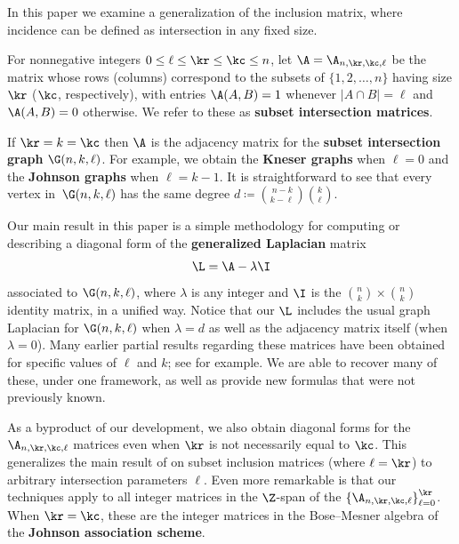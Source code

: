 In this paper we examine a generalization of the inclusion matrix, where incidence can be defined as intersection in any fixed size.


\begin{firstdef}
For nonnegative integers $0 \leq \ell \leq \kr \leq \kc \leq n$, let $\A = \A_{n,\kr,\kc,\ell}$ be the matrix whose rows (columns) correspond to the subsets of $\{1, 2, \ldots, n\}$ having size $\kr$ ($\kc$, respectively), with entries $\A(A, B) = 1$ whenever $|A \cap B| = \ell$ and $\A(A, B) = 0$ otherwise.  
We refer to these as {\bf subset intersection matrices}.
\end{firstdef}



If $\kr = k = \kc$ then $\A$ is the adjacency matrix for the {\bf subset intersection graph} $\G(n,k,\ell)$.  
For example, we obtain the {\bf Kneser graphs}  when $\ell = 0$ and the {\bf Johnson graphs}  when $\ell = k - 1$.
It is straightforward to see that every vertex in~$\G(n,k,\ell)$ has the same degree $d \coloneqq  {\binom{n-k}{k-\ell} }\binom{k}{\ell}$.  

Our main result in this paper is a simple methodology for computing or describing a diagonal form of the {\bf generalized Laplacian} matrix
\[ \L = \A - \lambda \I \]
associated to $\G(n,k,\ell)$, where $\lambda$ is any integer and $\I$ is the $\binom{n}{k} \times \binom{n}{k}$ identity matrix, in a unified way.  Notice that our $\L$ includes the usual graph Laplacian for $\G(n,k,\ell)$ when $\lambda = d$ as well as the adjacency matrix itself (when $\lambda = 0$).  Many earlier partial results regarding these matrices have been obtained for specific values of $\ell$ and $k$; see \cite{line, brouwer:prank, duceysinhill, ds, wilson_classic} for example.  We are able to recover many of these, under one framework, as well as provide new formulas that were not previously known.  

As a byproduct of our development, we also obtain diagonal forms for the $\A_{n,\kr,\kc,\ell}$ matrices even when $\kr$ is not necessarily equal to $\kc$.  This generalizes the main result of \cite{wilson_classic} on subset inclusion matrices (where $\ell = \kr$) to arbitrary intersection parameters $\ell$.  Even more remarkable is that our techniques apply to all integer matrices in the $\Z$-span of the $\left \{ \A_{n,\kr,\kc,\ell}\right \}_{\ell = 0}^{\kr}$.  When $\kr = \kc$, these are the integer matrices in the Bose--Mesner algebra of the {\bf Johnson association scheme}.

